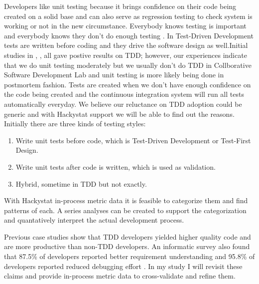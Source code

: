 \label{sec:statement}

Developers like unit testing because it brings confidence \cite{Hunt:03} on
their code being created on a solid base and can also serve as regression
testing to check system is working or not in the new circumstance.
Everybody knows testing is important and everybody knows they don't do
enough testing \cite{Beck:00}.  In Test-Driven Development tests are
written before coding and they drive the software design as well.Initial
studies in \cite{Edwards:04}, \cite{George:2003}, \cite{Maximilien:2003}
all gave postive results on TDD; however, our experiences indicate that we
do unit testing moderately but we usually don't do TDD in Collborative
Software Development Lab and unit testing is more likely being done in
postmortem fashion. Tests are created when we don't have enough confidence
on the code being created and the continuous integration system will run
all tests automatically everyday. We believe our reluctance on TDD adoption
could be generic and with Hackystat support we will be able to find out the
reasons. Initially there are three kinds of testing styles:

\begin{enumerate}
\item Write unit tests before code, which is Test-Driven Development or
Test-First Design.
\item Write unit tests after code is written, which is used as validation. 
\item Hybrid, sometime in TDD but not exactly.
\end{enumerate}

With Hackystat in-process metric data it is feasible to categorize them and
find patterns of each. A series analyses can be created to support the
categorization and quantatively interpret the actual development process.

Previous case studies show that TDD developers yielded higher quality code
and are more productive than non-TDD developers.  An informatic survey also
found that 87.5\% of developers reported better requirement understanding
and 95.8\% of developers reported reduced debugging effort
\cite{HawleyBlog}. In my study I will revisit these claims and provide
in-process metric data to cross-validate and refine them.













